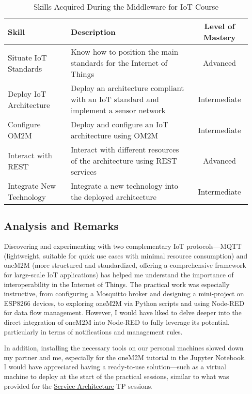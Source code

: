 \begin{table}[H]
    \centering
    \renewcommand{\arraystretch}{1.5} %
    \begin{tabular}{|>{\raggedright}p{3.5cm}|p{8cm}|c|}
    \hline
    \rowcolor[gray]{0.8}
    \textbf{Skill} & \textbf{Description} & \textbf{Level of Mastery} \\
    \hline
    Situate IoT Standards & Know how to position the main standards for the Internet of Things & Advanced \\
    \hline
    Deploy IoT Architecture & Deploy an architecture compliant with an IoT standard and implement a sensor network & Intermediate \\
    \hline
    Configure OM2M & Deploy and configure an IoT architecture using OM2M & Intermediate \\
    \hline
    Interact with REST & Interact with different resources of the architecture using REST services & Advanced \\
    \hline
    Integrate New Technology & Integrate a new technology into the deployed architecture & Intermediate \\
    \hline
    \end{tabular}
    \caption{Skills Acquired During the Middleware for IoT Course}
    \label{tab:skills_acquired}
\end{table}

\subsection{Analysis and Remarks}
Discovering and experimenting with two complementary IoT protocols—MQTT (lightweight, suitable for quick use cases with minimal resource consumption) and oneM2M (more structured and standardized, offering a comprehensive framework for large-scale IoT applications) has helped me understand the importance of interoperability in the Internet of Things. The practical work was especially instructive, from configuring a Mosquitto broker and designing a mini-project on ESP8266 devices, to exploring oneM2M via Python scripts and using Node-RED for data flow management.
However, I would have liked to delve deeper into the direct integration of oneM2M into Node-RED to fully leverage its potential, particularly in terms of notifications and management rules.
\vspace{0.25cm}

In addition, installing the necessary tools on our personal machines slowed down my partner and me, especially for the oneM2M tutorial in the Jupyter Notebook. I would have appreciated having a ready-to-use solution—such as a virtual machine to deploy at the start of the practical sessions, similar to what was provided for the \hyperref[sec:service_architecture]{Service Architecture} TP sessions.
\vspace{0.25cm}

